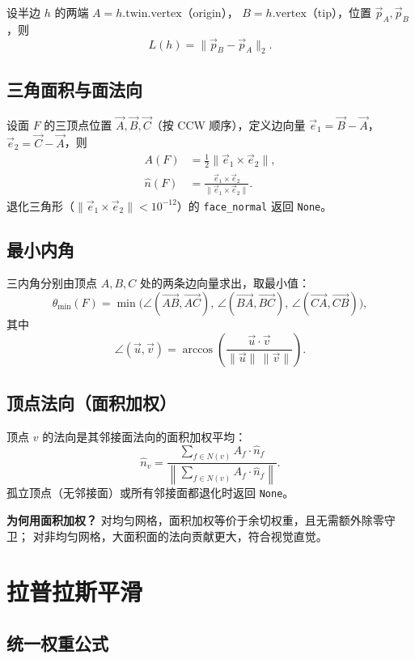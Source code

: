 \documentclass[11pt,a4paper]{article}
\begin{document}
设半边 $h$ 的两端 $A = h.\mathrm{twin}.\mathrm{vertex}$（origin），
$B = h.\mathrm{vertex}$（tip），位置 $\vec{p}_A, \vec{p}_B$，则
\[
  L(h) = \|\vec{p}_B - \vec{p}_A\|_2.
\]

\subsection{三角面积与面法向}

设面 $F$ 的三顶点位置 $\vec{A}, \vec{B}, \vec{C}$（按 CCW 顺序），定义边向量
$\vec{e}_1 = \vec{B} - \vec{A}$，$\vec{e}_2 = \vec{C} - \vec{A}$，则
\begin{align}
  A(F) &= \tfrac{1}{2} \|\vec{e}_1 \times \vec{e}_2\|, \\
  \hat{n}(F) &= \frac{\vec{e}_1 \times \vec{e}_2}{\|\vec{e}_1 \times \vec{e}_2\|}.
\end{align}
退化三角形（$\|\vec{e}_1 \times \vec{e}_2\| < 10^{-12}$）的 \texttt{face\_normal}
返回 \texttt{None}。

\subsection{最小内角}

三内角分别由顶点 $A, B, C$ 处的两条边向量求出，取最小值：
\[
  \theta_{\min}(F) = \min\bigl(
    \angle(\vec{AB}, \vec{AC}),\,
    \angle(\vec{BA}, \vec{BC}),\,
    \angle(\vec{CA}, \vec{CB})
  \bigr),
\]
其中
\[
  \angle(\vec{u}, \vec{v}) = \arccos\!\left(\frac{\vec{u} \cdot \vec{v}}{\|\vec{u}\|\,\|\vec{v}\|}\right).
\]

\subsection{顶点法向（面积加权）}

顶点 $v$ 的法向是其邻接面法向的面积加权平均：
\[
  \hat{n}_v = \frac{\displaystyle\sum_{f \in N(v)} A_f \cdot \hat{n}_f}
                   {\displaystyle\left\| \sum_{f \in N(v)} A_f \cdot \hat{n}_f \right\|}.
\]
孤立顶点（无邻接面）或所有邻接面都退化时返回 \texttt{None}。

\textbf{为何用面积加权？} 对均匀网格，面积加权等价于余切权重，且无需额外除零守卫；
对非均匀网格，大面积面的法向贡献更大，符合视觉直觉。

\section{拉普拉斯平滑}

\subsection{统一权重公式}
\end{document}
